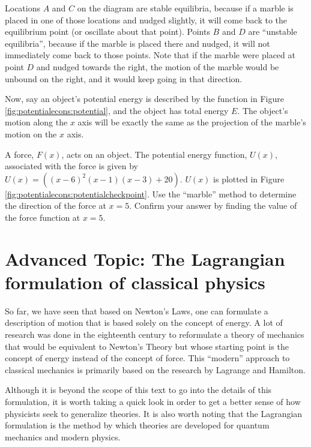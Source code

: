 Locations $A$ and $C$ on the diagram are stable equilibria, because if a marble is placed in one of those locations and nudged slightly, it will come back to the equilibrium point (or oscillate about that point). Points $B$ and $D$ are ``unstable equilibria'', because if the marble is placed there and nudged, it will not immediately come back to those points. Note that if the marble were placed at point $D$ and nudged towards the right, the motion of the marble would be unbound on the right, and it would keep going in that direction. 


Now, say an object's potential energy is described by the function in Figure \ref{fig:potentialecons:potential}, and the object has total energy $E$. The object's motion along the $x$ axis will be exactly the same as the projection of the marble's motion on the $x$ axis.

\begin{checkpoint}
A force, $F(x)$, acts on an object. The potential energy function, $U(x)$, associated with the force is given by $U(x)=((x-6)^2(x-1)(x-3)+20)$. $U(x)$ is plotted in Figure \ref{fig:potentialecons:potentialcheckpoint}. Use the ``marble'' method to determine the direction of the force at $x=5$. Confirm your answer by finding the value of the force function at $x=5$.
\end{checkpoint}

\section{Advanced Topic: The Lagrangian formulation of classical physics}
So far, we have seen that based on Newton's Laws, one can formulate a description of motion that is based solely on the concept of energy. A lot of research was done in the eighteenth century to reformulate a theory of mechanics that would be equivalent to Newton's Theory but whose starting point is the concept of energy instead of the concept of force. This ``modern'' approach to classical mechanics is primarily based on the research by Lagrange and Hamilton. 

Although it is beyond the scope of this text to go into the details of this formulation, it is worth taking a quick look in order to get a better sense of how physicists seek to generalize theories. It is also worth noting that the Lagrangian formulation is the method by which theories are developed for quantum mechanics and modern physics. 

